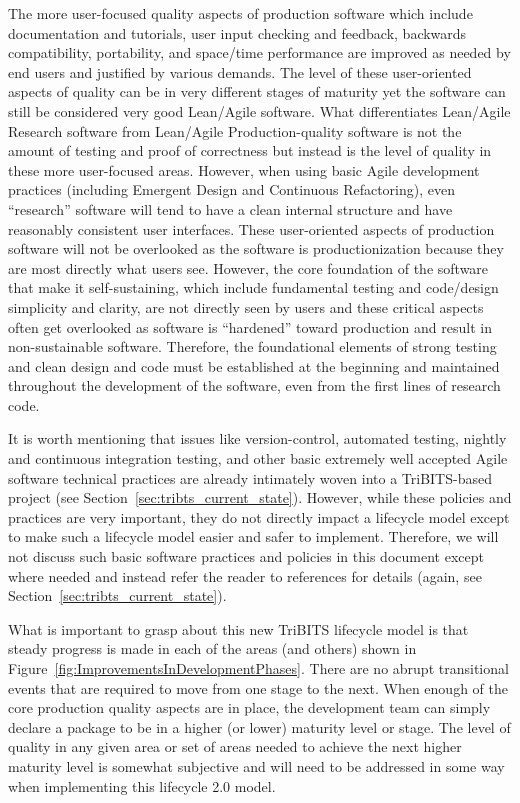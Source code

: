 \documentclass[11pt]{SANDreport}
\begin{document}
The more user-focused quality aspects of production software which
include documentation and tutorials, user input checking and feedback,
backwards compatibility, portability, and space/time performance are
improved as needed by end users and justified by various demands.  The
level of these user-oriented aspects of quality can be in very
different stages of maturity yet the software can still be considered
very good Lean/Agile software.  What differentiates Lean/Agile
Research software from Lean/Agile Production-quality software is not
the amount of testing and proof of correctness but instead is the
level of quality in these more user-focused areas.  However, when
using basic Agile development practices (including Emergent Design and
Continuous Refactoring), even ``research'' software will tend to have
a clean internal structure and have reasonably consistent user
interfaces.  These user-oriented aspects of production software will
not be overlooked as the software is productionization because they
are most directly what users see.  However, the core foundation of the
software that make it self-sustaining, which include fundamental
testing and code/design simplicity and clarity, are not directly seen
by users and these critical aspects often get overlooked as software
is ``hardened'' toward production and result in non-sustainable
software.  Therefore, the foundational elements of strong testing and
clean design and code must be established at the beginning and
maintained throughout the development of the software, even from the
first lines of research code.

It is worth mentioning that issues like version-control, automated
testing, nightly and continuous integration testing, and other basic
extremely well accepted Agile software technical practices are already
intimately woven into a TriBITS-based project (see
Section~\ref{sec:tribts_current_state}).  However, while these
policies and practices are very important, they do not directly impact
a lifecycle model except to make such a lifecycle model easier and
safer to implement.  Therefore, we will not discuss such basic
software practices and policies in this document except where needed
and instead refer the reader to references for details (again, see
Section~\ref{sec:tribts_current_state}).

What is important to grasp about this new TriBITS lifecycle model is
that steady progress is made in each of the areas (and others) shown
in Figure~\ref{fig:ImprovementsInDevelopmentPhases}.  There are no
abrupt transitional events that are required to move from one stage to
the next.  When enough of the core production quality aspects are in
place, the development team can simply declare a package to be in a
higher (or lower) maturity level or stage.  The level of quality in
any given area or set of areas needed to achieve the next higher
maturity level is somewhat subjective and will need to be addressed in
some way when implementing this lifecycle 2.0 model.
\end{document}
